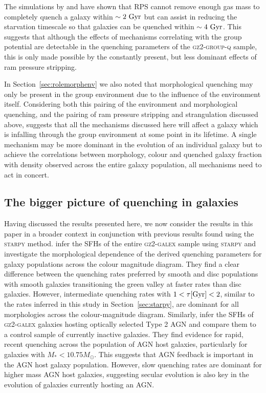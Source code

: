 \documentclass[useAMS,usenatbib]{mn2e}
\begin{document}
The simulations by \cite{fillingham16} and \cite{emerick16} have shown that RPS cannot remove enough gas mass to completely quench a galaxy within $\sim2~\rm{Gyr}$ but can assist in reducing the starvation timescale so that galaxies can be quenched within $\sim4~\rm{Gyr}$. This suggests that although the effects of mechanisms correlating with the group potential are detectable in the quenching parameters of the \textsc{gz2-group-q} sample, this is only made possible by the constantly present, but less dominant effects of ram pressure stripping. 

In Section~\ref{sec:rolemorphenv} we also noted that morphological quenching may only be present in the group environment due to the influence of the environment itself. Considering both this pairing of the environment and morphological quenching, and the pairing of ram pressure stripping and strangulation discussed above, suggests that all the mechanisms discussed here will affect a galaxy which is infalling through the group environment at some point in its lifetime. A single mechanism may be more dominant in the evolution of an individual galaxy but to achieve the correlations between morphology, colour and quenched galaxy fraction with density observed across the entire galaxy population, all mechanisms need to act in concert.  

\subsection{The bigger picture of quenching in galaxies}\label{sec:bigpic}

Having discussed the results presented here, we now consider the results in this paper in a broader context in conjunction with previous results found using the \textsc{starpy} method. \cite{smethurst15} infer the SFHs of the entire \textsc{gz2-galex} sample using \textsc{starpy} and investigate the morphological dependence of the derived quenching parameters for galaxy populations across the colour magnitude diagram. They find a clear difference between the quenching rates preferred by smooth and disc populations with smooth galaxies transitioning the green valley at faster rates than disc galaxies. However, intermediate quenching rates with $1 < \tau \rm{[Gyr]} < 2$, similar to the rates inferred in this study in Section~\ref{sec:starpy}, are dominant for all morphologies across the colour-magnitude diagram. Similarly, \cite{smethurst16} infer the SFHs of \textsc{gz2-galex} galaxies hosting optically selected Type 2 AGN and compare them to a control sample of currently inactive galaxies. They find evidence for rapid, recent quenching across the population of AGN host galaxies, particularly for galaxies with $M_* < 10.75 M_{\odot}$. This suggests that AGN feedback is important in the AGN host galaxy population. However, slow quenching rates are dominant for higher mass AGN host galaxies, suggesting secular evolution is also key in the evolution of galaxies currently hosting an AGN.  
\end{document}
